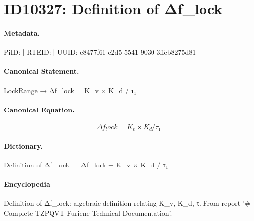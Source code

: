 \section*{ID10327: Definition of Δf\_lock}
\paragraph{Metadata.}
PiID:  | RTEID:  | UUID: e8477f61-e2d5-5541-9030-3ffeb8275d81

\paragraph{Canonical Statement.}
LockRange → Δf\_lock = K\_v × K\_d / τ₁

\paragraph{Canonical Equation.}
\[
Δf_lock = K_v × K_d / τ₁
\]

\paragraph{Dictionary.}
Definition of Δf\_lock — Δf\_lock = K\_v × K\_d / τ₁

\paragraph{Encyclopedia.}
Definition of Δf\_lock: algebraic definition relating K\_v, K\_d, τ. From report '\# Complete TZPQVT-Furiene Technical Documentation'.
